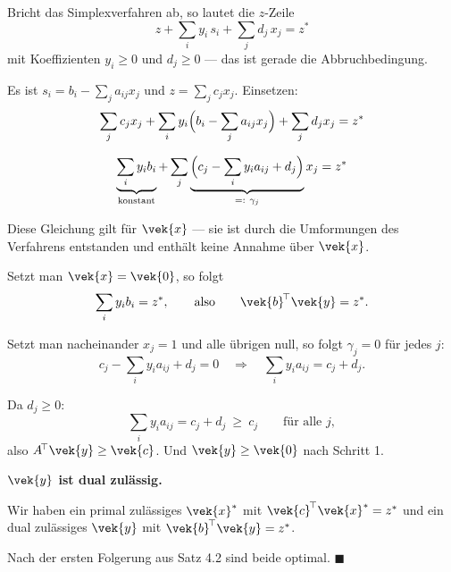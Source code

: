 \begin{merksatz}
Bricht das Simplexverfahren ab, so lautet die $z$-Zeile
\[ z + \sum_{i} y_i\,s_i + \sum_j d_j\,x_j = z^{*} \]
mit  Koeffizienten $y_i \ge 0$ und $d_j \ge 0$ --- das ist gerade die Abbruchbedingung.

\begin{center}
\begin{minipage}{0.88\textwidth}
\end{minipage}
\end{center}

Es ist $s_i = b_i - \sum_j a_{ij}x_j$ und $z = \sum_j c_jx_j$. Einsetzen:
\[ \sum_j c_jx_j + \sum_i y_i\Bigl(b_i - \sum_j a_{ij}x_j\Bigr) + \sum_j d_jx_j = z^{*} \]

\[ \underbrace{\sum_i y_ib_i}_{\text{konstant}} + \sum_j \underbrace{\Bigl(c_j - \sum_i y_ia_{ij} + d_j\Bigr)}_{=:\ \gamma_j} x_j = z^{*} \]

Diese Gleichung gilt für  $\vek{x}$ --- sie ist durch die Umformungen des Verfahrens entstanden und enthält keine Annahme über $\vek{x}$.

Setzt man $\vek{x}=\vek{0}$, so folgt
\[ \sum_i y_ib_i = z^{*} , \qquad\text{also}\qquad \vek{b}^{\!\top}\vek{y} = z^{*} . \]

Setzt man nacheinander $x_j = 1$ und alle übrigen null, so folgt $\gamma_j = 0$ für jedes $j$:
\[ c_j - \sum_i y_ia_{ij} + d_j = 0 \quad\Longrightarrow\quad \sum_i y_i a_{ij} = c_j + d_j . \]

Da $d_j \ge 0$:
\[ \sum_i y_i a_{ij} = c_j + d_j \ \ge\ c_j \qquad\text{für alle } j , \]
also $A^{\!\top}\vek{y}\ge\vek{c}$. Und $\vek{y}\ge\vek{0}$ nach Schritt 1.

\textbf{$\vek{y}$ ist dual zulässig.}

Wir haben ein primal zulässiges $\vek{x}^{*}$ mit $\vek{c}^{\!\top}\vek{x}^{*} = z^{*}$ und ein dual zulässiges $\vek{y}$ mit $\vek{b}^{\!\top}\vek{y} = z^{*}$.

Nach der ersten Folgerung aus Satz 4.2 sind beide optimal. $\blacksquare$

\begin{center}
\begin{minipage}{0.88\textwidth}
\end{minipage}
\end{center}
\end{merksatz}

